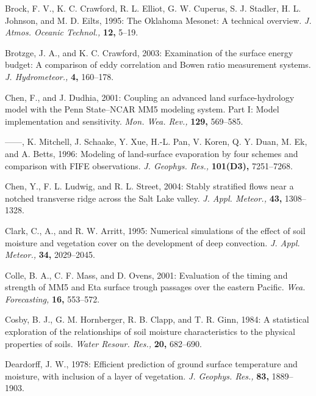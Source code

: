 \documentclass[twocolumn]{article}
\begin{document}
\begin{references}
{\item Brock, F. V., K. C. Crawford, R. L. Elliot, G. W. Cuperus, S. J. Stadler, H. L. Johnson, and M. D. Eilts, 1995: The Oklahoma Mesonet: A technical overview. \textit{J. Atmos. Oceanic Technol.,} \textbf{12,} 5--19.

\item Brotzge, J. A., and K. C. Crawford, 2003: Examination of the surface energy budget: A comparison of eddy correlation and Bowen ratio measurement systems. \textit{J. Hydrometeor.,} \textbf{4,} 160--178.

\item Chen, F., and J. Dudhia, 2001: Coupling an advanced land surface-hydrology model with the Penn State--NCAR MM5 modeling system. Part I: Model implementation and sensitivity. \textit{Mon. Wea. Rev.,} \textbf{129,} 569--585.

\item ------, K. Mitchell, J. Schaake, Y. Xue, H.-L. Pan, V. Koren, Q. Y. Duan, M. Ek, and A. Betts, 1996: Modeling of land-surface evaporation by four schemes and comparison with FIFE observations. \textit{J. Geophys. Res.,} \textbf{101(D3),} 7251--7268.

\item Chen, Y., F. L. Ludwig, and R. L. Street, 2004: Stably stratified flows near a notched transverse ridge across the Salt Lake valley. \textit{J. Appl. Meteor.,} \textbf{43,} 1308--1328.

\item Clark, C., A., and R. W. Arritt, 1995: Numerical simulations of the effect of soil moisture and vegetation cover on the development of deep convection. \textit{J. Appl. Meteor.,} \textbf{34,} 2029--2045.

\item Colle, B. A., C. F. Mass, and D. Ovens, 2001: Evaluation of the timing and strength of MM5 and Eta surface trough passages over the eastern Pacific. \textit{Wea. Forecasting,} \textbf{16,} 553--572.

\item Cosby, B. J., G. M. Hornberger, R. B. Clapp, and T. R. Ginn, 1984: A statistical exploration of the relationships of soil moisture characteristics to the physical properties of soils. \textit{Water Resour. Res.,} \textbf{20,} 682--690.

\item Deardorff, J. W., 1978: Efficient prediction of ground surface temperature and moisture, with inclusion of a layer of vegetation. \textit{J. Geophys. Res.,} \textbf{83,} 1889--1903.

}
\end{references}
\end{document}

